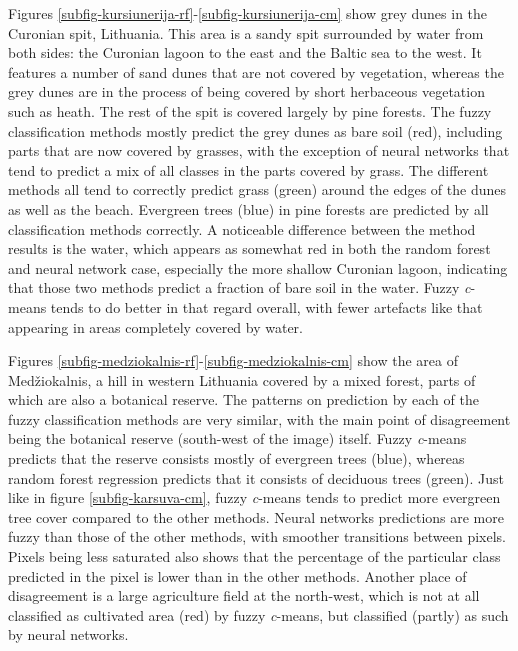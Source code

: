 \documentclass[a4paper,10pt]{book}
\begin{document}
Figures \ref{subfig-kursiunerija-rf}-\ref{subfig-kursiunerija-cm} show grey dunes in the Curonian spit, Lithuania. This area is a sandy spit surrounded by water from both sides: the Curonian lagoon to the east and the Baltic sea to the west. It features a number of sand dunes that are not covered by vegetation, whereas the grey dunes are in the process of being covered by short herbaceous vegetation such as heath. The rest of the spit is covered largely by pine forests. The fuzzy classification methods mostly predict the grey dunes as bare soil (red), including parts that are now covered by grasses, with the exception of neural networks that tend to predict a mix of all classes in the parts covered by grass. The different methods all tend to correctly predict grass (green) around the edges of the dunes as well as the beach. Evergreen trees (blue) in pine forests are predicted by all classification methods correctly. A noticeable difference between the method results is the water, which appears as somewhat red in both the random forest and neural network case, especially the more shallow Curonian lagoon, indicating that those two methods predict a fraction of bare soil in the water. Fuzzy \textit{c}-means tends to do better in that regard overall, with fewer artefacts like that appearing in areas completely covered by water.

Figures \ref{subfig-medziokalnis-rf}-\ref{subfig-medziokalnis-cm} show the area of Med\v{z}iokalnis, a hill in western Lithuania covered by a mixed forest, parts of which are also a botanical reserve. The patterns on prediction by each of the fuzzy classification methods are very similar, with the main point of disagreement being the botanical reserve (south-west of the image) itself. Fuzzy \textit{c}-means predicts that the reserve consists mostly of evergreen trees (blue), whereas random forest regression predicts that it consists of deciduous trees (green). Just like in figure \ref{subfig-karsuva-cm}, fuzzy \textit{c}-means tends to predict more evergreen tree cover compared to the other methods. Neural networks predictions are more fuzzy than those of the other methods, with smoother transitions between pixels. Pixels being less saturated also shows that the percentage of the particular class predicted in the pixel is lower than in the other methods. Another place of disagreement is a large agriculture field at the north-west, which is not at all classified as cultivated area (red) by fuzzy \textit{c}-means, but classified (partly) as such by neural networks.
\end{document}
